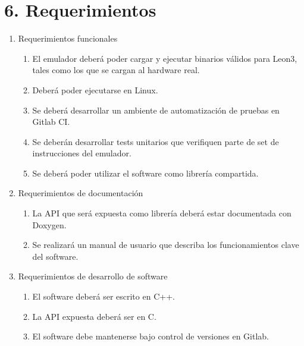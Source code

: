 \section{6. Requerimientos}
\label{sec:6-requerimientos}

\begin{enumerate}
\item Requerimientos funcionales
  \begin{enumerate}
  \item El emulador deberá poder cargar y ejecutar binarios válidos para Leon3, tales como los que se cargan al hardware real.
  \item Deberá poder ejecutarse en Linux.
  \item Se deberá desarrollar un ambiente de automatización de pruebas en Gitlab CI.
  \item Se deberán desarrollar tests unitarios que verifiquen parte de set de instrucciones del emulador.
  \item Se deberá poder utilizar el software como librería compartida.
  \end{enumerate}

\item Requerimientos de documentación
  \begin{enumerate}
  \item La API que será expuesta como librería deberá estar documentada con Doxygen.
  \item Se realizará un manual de usuario que describa los funcionamientos clave del software.
  \end{enumerate}

\item Requerimientos de desarrollo de software
  \begin{enumerate}
  \item El software deberá ser escrito en C++.
  \item La API expuesta deberá ser en C.
  \item El software debe mantenerse bajo control de versiones en Gitlab.
  \end{enumerate}
\end{enumerate}


